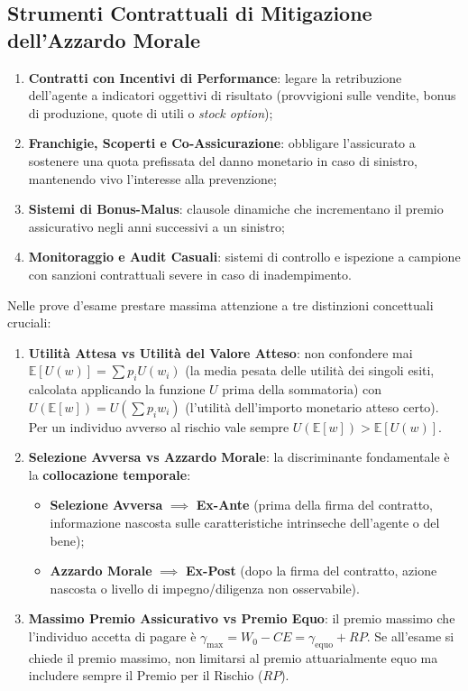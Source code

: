\subsection{Strumenti Contrattuali di Mitigazione dell'Azzardo Morale}
\begin{enumerate}
    \item \textbf{Contratti con Incentivi di Performance}: legare la retribuzione dell'agente a indicatori oggettivi di risultato (provvigioni sulle vendite, bonus di produzione, quote di utili o \textit{stock option});
    \item \textbf{Franchigie, Scoperti e Co-Assicurazione}: obbligare l'assicurato a sostenere una quota prefissata del danno monetario in caso di sinistro, mantenendo vivo l'interesse alla prevenzione;
    \item \textbf{Sistemi di Bonus-Malus}: clausole dinamiche che incrementano il premio assicurativo negli anni successivi a un sinistro;
    \item \textbf{Monitoraggio e Audit Casuali}: sistemi di controllo e ispezione a campione con sanzioni contrattuali severe in caso di inadempimento.
\end{enumerate}

\begin{esame}
Nelle prove d'esame prestare massima attenzione a tre distinzioni concettuali cruciali:
\begin{enumerate}
    \item \textbf{Utilità Attesa vs Utilità del Valore Atteso}: non confondere mai $\mathbb{E}[U(w)] = \sum p_i U(w_i)$ (la media pesata delle utilità dei singoli esiti, calcolata applicando la funzione $U$ prima della sommatoria) con $U(\mathbb{E}[w]) = U(\sum p_i w_i)$ (l'utilità dell'importo monetario atteso certo). Per un individuo avverso al rischio vale sempre $U(\mathbb{E}[w]) > \mathbb{E}[U(w)]$.
    \item \textbf{Selezione Avversa vs Azzardo Morale}: la discriminante fondamentale è la \textbf{collocazione temporale}:
    \begin{itemize}
        \item \textbf{Selezione Avversa} $\implies$ \textbf{Ex-Ante} (prima della firma del contratto, informazione nascosta sulle caratteristiche intrinseche dell'agente o del bene);
        \item \textbf{Azzardo Morale} $\implies$ \textbf{Ex-Post} (dopo la firma del contratto, azione nascosta o livello di impegno/diligenza non osservabile).
    \end{itemize}
    \item \textbf{Massimo Premio Assicurativo vs Premio Equo}: il premio massimo che l'individuo accetta di pagare è $\gamma_{\max} = W_0 - CE = \gamma_{\text{equo}} + RP$. Se all'esame si chiede il premio massimo, non limitarsi al premio attuarialmente equo ma includere sempre il Premio per il Rischio ($RP$).
\end{enumerate}
\end{esame}

